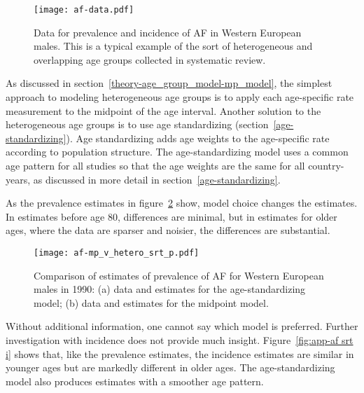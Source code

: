     \begin{figure}[h]
        \begin{center}
            \texttt{[image: af-data.pdf]}
            \caption[Systematic review data of atrial fibrillation.]{Data for
              prevalence and incidence of AF in
              Western European males.  This is a typical example of
              the sort of heterogeneous and overlapping age groups
              collected in systematic review.}
            \label{fig:app-af data}
        \end{center}
    \end{figure}

As discussed in section~\ref{theory-age_group_model-mp_model},
the simplest approach to modeling heterogeneous age groups is to apply
each age-specific rate measurement to the midpoint of the age interval.
Another solution to the heterogeneous age groups is to use age standardizing
(section~\ref{age-standardizing}).  Age standardizing adds age weights to the age-specific rate according
to population structure.  The age-standardizing model uses a common
age pattern for all studies so that the age weights are the same for
all country-years, as discussed in more detail in section~\ref{age-standardizing}.

As the prevalence estimates in figure~\ref{fig:app-af srt p} show,
model choice changes the estimates.  In estimates before age 80,
differences are minimal, but in estimates for older ages, where the
data are sparser and noisier, the differences are substantial.

    \begin{figure}[h]
        \begin{center}
            \texttt{[image: af-mp\_v\_hetero\_srt\_p.pdf]}
            \caption[Comparison of prevalence estimates for atrial fibrillation
              using an age-standardizing model and midpoint model.]{Comparison
              of estimates of prevalence of AF for Western European
              males in 1990: (a) data and estimates for the
              age-standardizing model; (b) data and estimates for the
              midpoint model.}
            \label{fig:app-af srt p}
        \end{center}
    \end{figure}

Without additional information, one cannot say which model is preferred.
Further investigation with incidence does not provide much insight.
Figure~\ref{fig:app-af srt i} shows that, like the prevalence estimates, the
incidence estimates are similar in younger ages but are markedly different
in older ages.  The age-standardizing model also produces estimates with a
smoother age pattern.

